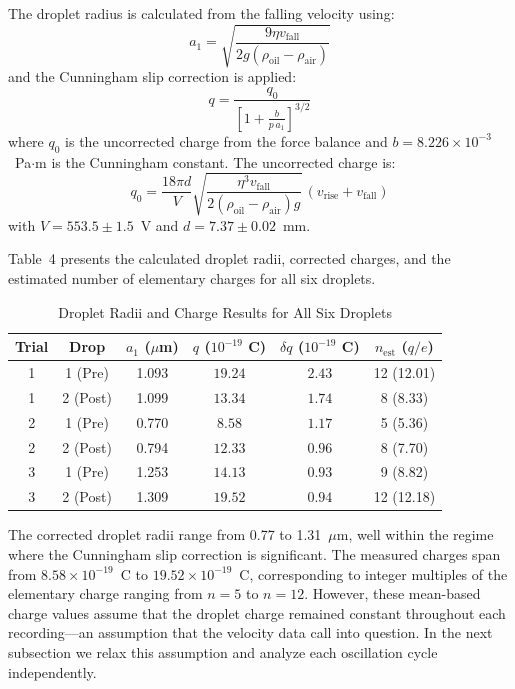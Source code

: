 \documentclass[11pt]{article}
\begin{document}
The droplet radius is calculated from the falling velocity using:
\begin{equation}
a_1 = \sqrt{\frac{9\eta v_{\text{fall}}}{2g(\rho_{\text{oil}} - \rho_{\text{air}})}}
\end{equation}
and the Cunningham slip correction is applied:
\begin{equation}
q = \frac{q_0}{\left[1 + \frac{b}{p \, a_1}\right]^{3/2}}
\end{equation}
where $q_0$ is the uncorrected charge from the force balance and $b = 8.226 \times 10^{-3}$~Pa$\cdot$m is the Cunningham constant. The uncorrected charge is:
\begin{equation}
q_0 = \frac{18\pi d}{V} \sqrt{\frac{\eta^3 v_{\text{fall}}}{2(\rho_{\text{oil}} - \rho_{\text{air}})g}} \, (v_{\text{rise}} + v_{\text{fall}})
\end{equation}
with $V = 553.5 \pm 1.5$~V and $d = 7.37 \pm 0.02$~mm.

Table~4 presents the calculated droplet radii, corrected charges, and the estimated number of elementary charges for all six droplets.

\begin{table}[h!]
    \centering
    \caption{Droplet Radii and Charge Results for All Six Droplets}
    \vspace{0.1in}
    \begin{tabular}{|c|c|c|c|c|c|}
    \hline
    \textbf{Trial} & \textbf{Drop} & \textbf{$a_1$ ($\mu$m)} & \textbf{$q$ ($10^{-19}$ C)} & \textbf{$\delta q$ ($10^{-19}$ C)} & \textbf{$n_{\text{est}}$ ($q/e$)} \\
    \hline
    1 & 1 (Pre)  & 1.093 & $19.24$ & $2.43$ & 12 (12.01) \\
    1 & 2 (Post) & 1.099 & $13.34$ & $1.74$ & 8 (8.33) \\
    \hline
    2 & 1 (Pre)  & 0.770 & $8.58$  & $1.17$ & 5 (5.36) \\
    2 & 2 (Post) & 0.794 & $12.33$ & $0.96$ & 8 (7.70) \\
    \hline
    3 & 1 (Pre)  & 1.253 & $14.13$ & $0.93$ & 9 (8.82) \\
    3 & 2 (Post) & 1.309 & $19.52$ & $0.94$ & 12 (12.18) \\
    \hline
    \end{tabular}
\end{table}

The corrected droplet radii range from 0.77 to 1.31~$\mu$m, well within the regime where the Cunningham slip correction is significant. The measured charges span from $8.58 \times 10^{-19}$~C to $19.52 \times 10^{-19}$~C, corresponding to integer multiples of the elementary charge ranging from $n = 5$ to $n = 12$. However, these mean-based charge values assume that the droplet charge remained constant throughout each recording---an assumption that the velocity data call into question. In the next subsection we relax this assumption and analyze each oscillation cycle independently.
\end{document}
